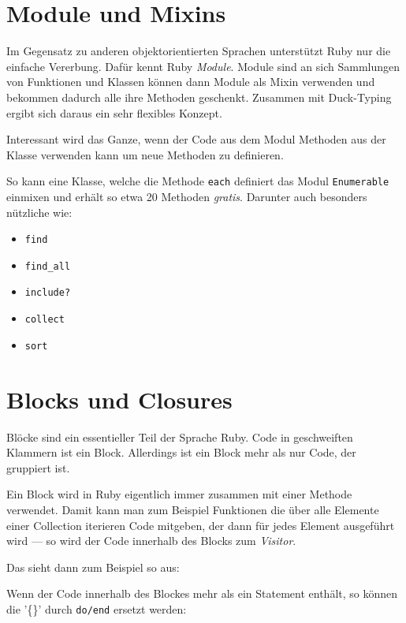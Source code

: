 \documentclass[a4book,11pt,twoside]{scrbook}
\begin{document}
\section{Module und Mixins} %
\label{sec:module_und_mixin}
Im Gegensatz zu anderen objektorientierten Sprachen unterstützt Ruby nur die einfache Vererbung. Dafür kennt Ruby \emph{Module}. Module sind an sich Sammlungen von Funktionen und Klassen können dann Module als Mixin verwenden und bekommen dadurch alle ihre Methoden geschenkt. Zusammen mit Duck-Typing ergibt sich daraus ein sehr flexibles Konzept.

Interessant wird das Ganze, wenn der Code aus dem Modul Methoden aus der Klasse verwenden kann um neue Methoden zu definieren.

So kann eine Klasse, welche die Methode \texttt{each} definiert das Modul \texttt{Enumerable} einmixen und erhält so etwa 20 Methoden \emph{gratis}. Darunter auch besonders nützliche wie:
\begin{itemize}
	\item \texttt{find}
	\item \texttt{find\_all}
	\item \texttt{include?}
	\item \texttt{collect}
	\item \texttt{sort}
\end{itemize}


\section{Blocks und Closures} %
\label{sec:blocks_und_closures}
Blöcke sind ein essentieller Teil der Sprache Ruby. Code in geschweiften Klammern ist ein Block. Allerdings ist ein Block mehr als nur Code, der gruppiert ist.

Ein Block wird in Ruby eigentlich immer zusammen mit einer Methode verwendet. Damit kann man zum Beispiel Funktionen die über alle Elemente einer Collection iterieren Code mitgeben, der dann für jedes Element ausgeführt wird — so wird der Code innerhalb des Blocks zum \emph{Visitor}.

Das sieht dann zum Beispiel so aus:



Wenn der Code innerhalb des Blockes mehr als ein Statement enthält, so können die '\{\}' durch \texttt{do/end} ersetzt werden:


\end{document}
